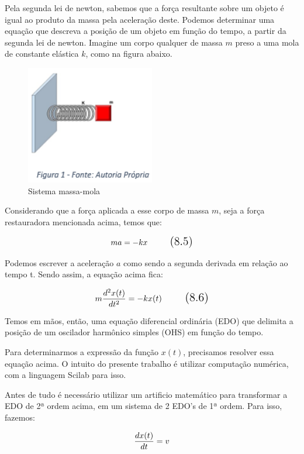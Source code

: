 Pela segunda lei de newton, sabemos que a força resultante sobre um objeto é igual ao produto da massa pela aceleração deste.  Podemos determinar uma equação que descreva a posição de um objeto em função do tempo, a partir da segunda lei de newton. Imagine um corpo qualquer de massa $m$ preso a uma mola de constante elástica $k$, como na figura abaixo.

\begin{figure}[H]
	\centering
	\includegraphics[width=0.5\textwidth]{./Imagens/OHS/ohs1.png} 
	\caption{Sistema massa-mola}
	\label{fig:OHS1}
\end{figure}

Considerando que a força aplicada a esse corpo de massa $m$, seja a força restauradora mencionada acima, temos que:

\begin{equation}
\Large ma = -kx
\tag{8.5}
\end{equation}

Podemos escrever a aceleração $a$ como sendo a segunda derivada em relação ao tempo t. Sendo assim, a equação acima fica: 

\begin{equation}
\Large m \frac{d^2x(t)}{dt^2} = -kx(t)
\tag{8.6}
\end{equation}


Temos em mãos, então, uma equação diferencial ordinária (EDO) que delimita a posição de um oscilador harmônico simples (OHS) em função do tempo.

Para determinarmos a expressão da função $x(t)$, precisamos resolver essa equação acima.  O intuito do presente trabalho é utilizar computação numérica, com a linguagem Scilab para isso. 

Antes de tudo é necessário utilizar um artificio matemático para transformar a EDO de 2ª ordem acima, em um sistema de 2 EDO’s de 1ª ordem. Para isso, fazemos: 

\[\Large \frac{dx(t)}{dt} = v\]

